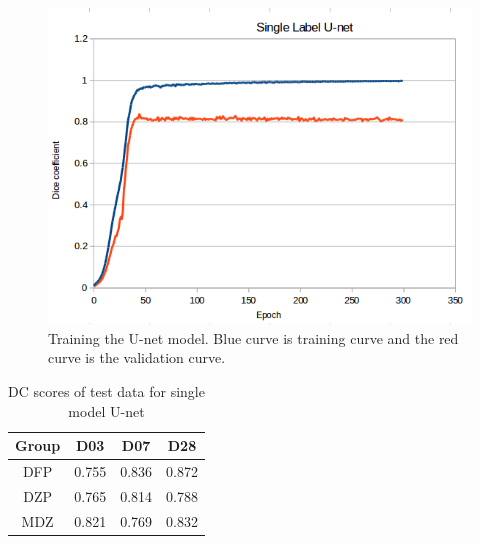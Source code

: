     
\begin{figure}[tbh]
\centering
\includegraphics[width=\textwidth]{results/train_results_single_unet.png}
\caption{Training the U-net model. Blue curve is training curve and the red curve is the validation curve. }
\label{fig:results_single_unet_train}
\end{figure}

\begin{table}[tbh]
\renewcommand{\arraystretch}{1}
\centering
\begin{tabular}{|c|c|c|c|}
\hline
\textbf{Group} & \textbf{D03}& \textbf{D07}& \textbf{D28}\\
\hline
DFP & 0.755 & 0.836 & 0.872\\      
\hline
DZP & 0.765 & 0.814 & 0.788\\
\hline
MDZ & 0.821 & 0.769 & 0.832\\ 
\hline
\end{tabular}
\caption{DC scores of test data for single model U-net}
\label{tab.single_model_results_Unet}
\end{table}


